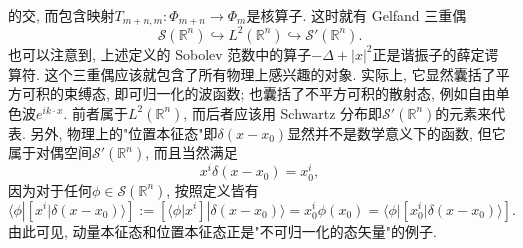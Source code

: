 的交, 而包含映射$T_{m+n,m}:\Phi_{m+n}\to\Phi_m$是核算子. 这时就有 Gelfand 三重偶$$
\mathcal{S}(\mathbb{R}^n)\hookrightarrow L^2(\mathbb{R}^n)\hookrightarrow \mathcal{S}'(\mathbb{R}^n).
$$也可以注意到, 上述定义的 Sobolev 范数中的算子$-\Delta+|x|^2$正是谐振子的薛定谔算符.
      这个三重偶应该就包含了所有物理上感兴趣的对象. 实际上, 它显然囊括了平方可积的束缚态, 即可归一化的波函数; 也囊括了不平方可积的散射态, 例如自由单色波$e^{ik\cdot x}$. 前者属于$L^2(\mathbb{R}^n)$, 而后者应该用 Schwartz 分布即$\mathcal{S}'(\mathbb{R}^n)$的元素来代表. 另外, 物理上的"位置本征态"即$\delta(x-x_0)$显然并不是数学意义下的函数, 但它属于对偶空间$\mathcal{S}'(\mathbb{R}^n)$, 而且当然满足$$
x^i\delta(x-x_0)=x_0^i,
$$因为对于任何$\phi\in\mathcal{S}(\mathbb{R}^n)$, 按照定义皆有$$
\langle\phi|\left[x^i|\delta(x-x_0)\rangle\right]:=\left[\langle\phi|x^i\right]|\delta(x-x_0)\rangle
=x_0^i\phi(x_0)=\langle\phi|\left[x_0^i|\delta(x-x_0)\rangle\right].
$$由此可见, 动量本征态和位置本征态正是"不可归一化的态矢量"的例子.
